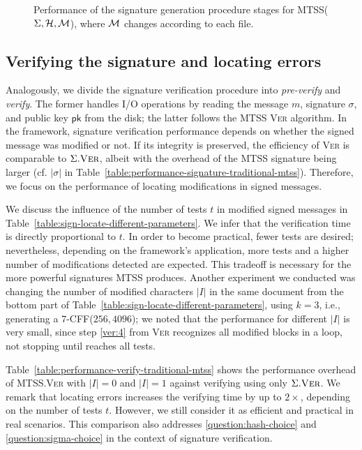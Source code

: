 \documentclass[12pt]{article}
\begin{document}
\begin{figure}[ht]
    \centering
    
    \caption{Performance of the signature generation procedure stages for MTSS($\Sigma, \mathcal{H}, \mathcal{M}$), where $\mathcal{M}$ changes according to each file.}
    \label{fig:performance-sign-algorithm}
\end{figure}

\subsection{Verifying the signature and locating errors}
\label{sec:verification}

Analogously, we divide the signature verification procedure into \textit{pre-verify} and \textit{verify}. The former handles I/O operations by reading the message $m$, signature $\sigma$, and public key $\mathsf{pk}$ from the disk; the latter follows the MTSS \textsc{Ver} algorithm. In the framework, signature verification performance depends on whether the signed message was modified or not. If its integrity is preserved, the efficiency of \textsc{Ver} is comparable to $\Sigma.\textsc{Ver}$, albeit with the overhead of the MTSS signature being larger (cf. $|\sigma|$ in Table~\ref{table:performance-signature-traditional-mtss}). Therefore, we focus on the performance of locating modifications in signed messages.

We discuss the influence of the number of tests $t$ in modified signed messages in Table~\ref{table:sign-locate-different-parameters}. We infer that the verification time is directly proportional to $t$. In order to become practical, fewer tests are desired; nevertheless, depending on the framework's application, more tests and a higher number of modifications detected are expected. This tradeoff is necessary for the more powerful signatures MTSS produces. Another experiment we conducted was changing the number of modified characters $|I|$ in the same document from the bottom part of Table~\ref{table:sign-locate-different-parameters}, using $k = 3$, i.e., generating a $7$-CFF($256, 4096$); we noted that the performance for different $|I|$ is very small, since step \ref{ver:4} from \textsc{Ver} recognizes all modified blocks in a loop, not stopping until reaches all tests.

Table~\ref{table:performance-verify-traditional-mtss} shows the performance overhead of MTSS.\textsc{Ver} with $|I| = 0$ and $|I| = 1$ against verifying using only $\Sigma.\textsc{Ver}$. We remark that locating errors increases the verifying time by up to $2 \times$, depending on the number of tests $t$. However, we still consider it as efficient and practical in real scenarios. This comparison also addresses \ref{question:hash-choice} and \ref{question:sigma-choice} in the context of signature verification.
\end{document}
